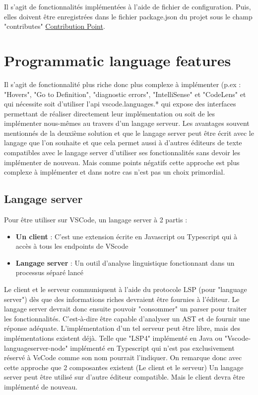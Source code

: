 \documentclass[
    iict, %
    il, %
]{heig-tb}
\begin{document}
Il s'agit de fonctionnalités implémentées à l'aide de fichier de configuration.
Puis, elles doivent être enregistrées dans le fichier package.json du projet sous le champ "contributes" \space \href{https://code.visualstudio.com/api/references/contribution-points}{ Contribution Point}.

\section{Programmatic language features}
Il s'agit de fonctionnalité plus riche donc plus complexe à implémenter (p.ex : "Hovers", "Go to Definition", "diagnostic errors", "IntelliSense" \space et "CodeLens" et qui nécessite soit d'utiliser l'api vscode.languages.* qui expose des interfaces permettant de réaliser directement leur implémentation ou soit de les implémenter nous-mêmes au travers d'un langage serveur. 
Les avantages souvent mentionnés de la deuxième solution et que le langage server peut être écrit avec le langage que l'on souhaite et que cela permet aussi à d'autres éditeurs de texte compatibles avec le langage server d'utiliser ses fonctionnalités sans devoir les implémenter de nouveau. Mais comme points négatifs cette approche est plus complexe à implémenter et dans notre cas n'est pas un choix primordial.

\subsection{Langage server}
Pour être utiliser sur VSCode, un langage server à 2 partis :
\begin{itemize}
    \item \textbf{Un client} : C'est une extension écrite en Javascript ou Typescript qui à accès à tous les endpoints de VScode
    \item \textbf{Langage server} : Un outil d'analyse linguistique fonctionnant dans un processus séparé lancé
\end{itemize}

Le client et le serveur communiquent à l'aide du protocole LSP (pour "language server") dès que des informations riches devraient être fournies à l'éditeur.
Le langage server devrait donc ensuite pouvoir "consommer" un parser pour traiter les fonctionnalités. C'est-à-dire être capable d'analyser un AST et de fournir une réponse adéquate.
L'implémentation d'un tel serveur peut être libre, mais des implémentations existent déjà. Telle que "LSP4" implémenté en Java ou  "Vscode-languageserver-node" implémenté en Typescript qui n'est pas exclusivement réservé à VsCode comme son nom pourrait l'indiquer.
On remarque donc avec cette approche que 2 composantes existent (Le client et le serveur)
Un langage server peut être utilisé sur d'autre éditeur compatible. Mais le client devra être implémenté de nouveau.
\end{document}
